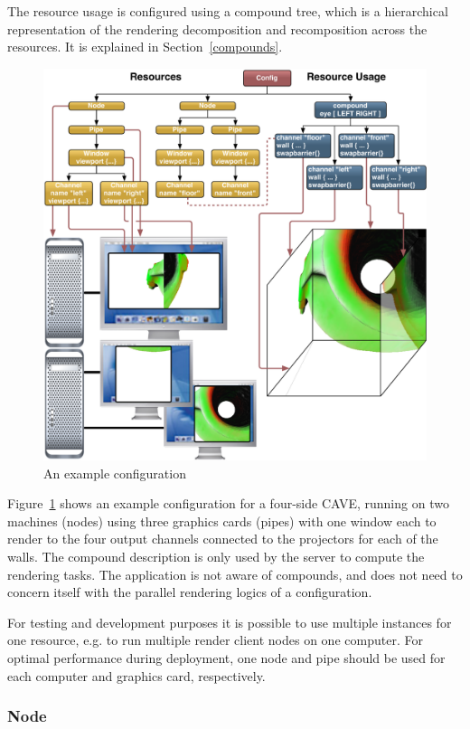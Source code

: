 \documentclass[10pt,a4]{scrartcl}
\newcommand{\fig}[1]{Figure~\ref{#1}}
\newcommand{\sref}[1]{Section~\ref{#1}}
\begin{document}
The resource usage is configured using a compound tree, which is a
hierarchical representation of the rendering decomposition and
recomposition across the resources. It is explained in \sref{compounds}.

\begin{figure}[ht!]\center
  \includegraphics[width=\textwidth]{images/cave.pdf}
  {\caption{\small\label{fConfig}An example configuration}}
\end{figure}

\fig{fConfig} shows an example configuration for a four-side
CAVE, running on two machines (nodes) using three graphics
cards (pipes) with one window each to render to the four output channels
connected to the projectors for each of the walls. The compound
description is only used by the server to compute the rendering
tasks. The application is not aware of compounds, and does not need to
concern itself with the parallel rendering logics of a configuration.

For testing and development purposes it is possible to use multiple
instances for one resource, e.g. to run multiple render client nodes on
one computer. For optimal performance during deployment, one node and
pipe should be used for each computer and graphics card, respectively.

\subsubsection{Node}
\end{document}
